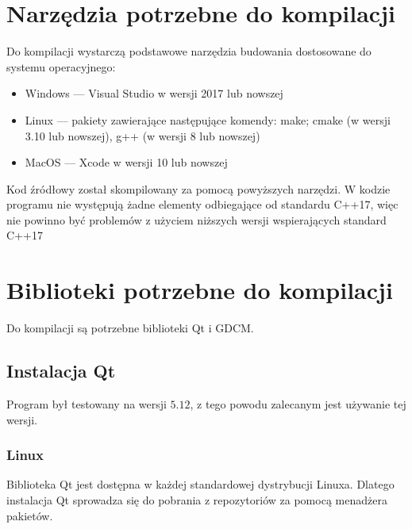 

\section{Narzędzia potrzebne do kompilacji}

\par
Do kompilacji wystarczą podstawowe narzędzia budowania dostosowane do systemu operacyjnego:

\begin{itemize}
    \item Windows --- Visual Studio w wersji 2017 lub nowszej
    \item Linux --- pakiety zawierające następujące komendy: make; cmake (w wersji 3.10 lub nowszej), g++ (w wersji 8 lub nowszej)
    \item MacOS --- Xcode w wersji 10 lub nowszej
\end{itemize}

Kod źródłowy został skompilowany za pomocą powyższych narzędzi.
W kodzie programu nie występują żadne elementy odbiegające od standardu C++17, więc nie powinno być problemów z użyciem niższych wersji wspierających standard C++17

\section{Biblioteki potrzebne do kompilacji}

Do kompilacji są potrzebne biblioteki Qt i GDCM.

\subsection{Instalacja Qt}

Program był testowany na wersji $5.12$, z tego powodu zalecanym jest używanie tej wersji.

\subsubsection*{Linux}

Biblioteka Qt jest dostępna w każdej standardowej dystrybucji Linuxa.
Dlatego instalacja Qt sprowadza się do pobrania z repozytoriów za pomocą menadżera pakietów.

